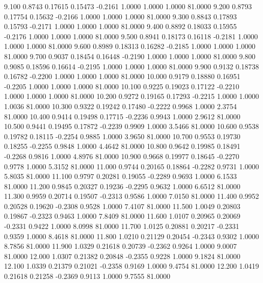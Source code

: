    9.100   0.8743   0.17615   0.15473  -0.2161   1.0000   1.0000   1.0000  81.0000
   9.200   0.8793   0.17754   0.15632  -0.2166   1.0000   1.0000   1.0000  81.0000
   9.300   0.8843   0.17893   0.15793  -0.2171   1.0000   1.0000   1.0000  81.0000
   9.400   0.8892   0.18033   0.15955  -0.2176   1.0000   1.0000   1.0000  81.0000
   9.500   0.8941   0.18173   0.16118  -0.2181   1.0000   1.0000   1.0000  81.0000
   9.600   0.8989   0.18313   0.16282  -0.2185   1.0000   1.0000   1.0000  81.0000
   9.700   0.9037   0.18454   0.16448  -0.2190   1.0000   1.0000   1.0000  81.0000
   9.800   0.9085   0.18596   0.16614  -0.2195   1.0000   1.0000   1.0000  81.0000
   9.900   0.9132   0.18738   0.16782  -0.2200   1.0000   1.0000   1.0000  81.0000
  10.000   0.9179   0.18880   0.16951  -0.2205   1.0000   1.0000   1.0000  81.0000
  10.100   0.9225   0.19023   0.17122  -0.2210   1.0000   1.0000   1.0000  81.0000
  10.200   0.9272   0.19165   0.17293  -0.2215   1.0000   1.0000   1.0036  81.0000
  10.300   0.9322   0.19242   0.17480  -0.2222   0.9968   1.0000   2.3754  81.0000
  10.400   0.9414   0.19498   0.17715  -0.2236   0.9943   1.0000   2.9612  81.0000
  10.500   0.9441   0.19495   0.17872  -0.2239   0.9909   1.0000   3.5466  81.0000
  10.600   0.9538   0.19782   0.18115  -0.2254   0.9885   1.0000   3.9650  81.0000
  10.700   0.9553   0.19730   0.18255  -0.2255   0.9848   1.0000   4.4642  81.0000
  10.800   0.9642   0.19985   0.18491  -0.2268   0.9816   1.0000   4.8976  81.0000
  10.900   0.9668   0.19977   0.18645  -0.2270   0.9778   1.0000   5.3152  81.0000
  11.000   0.9744   0.20165   0.18864  -0.2282   0.9731   1.0000   5.8035  81.0000
  11.100   0.9797   0.20281   0.19055  -0.2289   0.9693   1.0000   6.1533  81.0000
  11.200   0.9845   0.20327   0.19236  -0.2295   0.9632   1.0000   6.6512  81.0000
  11.300   0.9959   0.20714   0.19507  -0.2313   0.9586   1.0000   7.0150  81.0000
  11.400   0.9952   0.20528   0.19620  -0.2308   0.9528   1.0000   7.4107  81.0000
  11.500   1.0049   0.20803   0.19867  -0.2323   0.9463   1.0000   7.8409  81.0000
  11.600   1.0107   0.20965   0.20069  -0.2331   0.9422   1.0000   8.0998  81.0000
  11.700   1.0125   0.20881   0.20217  -0.2331   0.9359   1.0000   8.4618  81.0000
  11.800   1.0210   0.21129   0.20454  -0.2343   0.9302   1.0000   8.7856  81.0000
  11.900   1.0329   0.21618   0.20739  -0.2362   0.9264   1.0000   9.0007  81.0000
  12.000   1.0307   0.21382   0.20848  -0.2355   0.9228   1.0000   9.1824  81.0000
  12.100   1.0339   0.21379   0.21021  -0.2358   0.9169   1.0000   9.4754  81.0000
  12.200   1.0419   0.21618   0.21258  -0.2369   0.9113   1.0000   9.7555  81.0000
